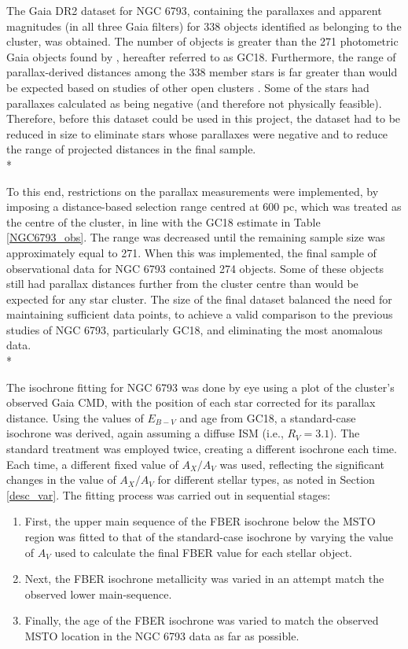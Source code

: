\documentclass[12pt, a4paper]{report}
\begin{document}
The Gaia DR2 dataset for NGC 6793, containing the parallaxes and apparent magnitudes (in all three Gaia filters) for 338 objects identified as belonging to the cluster, was obtained. The number of objects is greater than the 271 photometric Gaia objects found by \cite{2018A&A...616A..10G}, hereafter referred to as GC18. Furthermore, the range of parallax-derived distances among the 338 member stars is far greater than would be expected based on studies of other open clusters \citep{2006A&A...456..523S}. Some of the stars had parallaxes calculated as being negative (and therefore not physically feasible). Therefore, before this dataset could be used in this project, the dataset had to be reduced in size to eliminate stars whose parallaxes were negative and to reduce the range of projected distances in the final sample. \\*

To this end, restrictions on the parallax measurements were implemented, by imposing a distance-based selection range centred at 600 pc, which was treated as the centre of the cluster, in line with the GC18 estimate in Table \ref{NGC6793_obs}. The range was decreased until the remaining sample size was approximately equal to 271. When this was implemented, the final sample of observational data for NGC 6793 contained 274 objects. Some of these objects still had parallax distances further from the cluster centre than would be expected for any star cluster. The size of the final dataset balanced the need for maintaining sufficient data points, to achieve a valid comparison to the previous studies of NGC 6793, particularly GC18, and eliminating the most anomalous data.\\*

The isochrone fitting for NGC 6793 was done by eye using a plot of the cluster's observed Gaia CMD, with the position of each star corrected for its parallax distance. Using the values of $E_{B-V}$ and age from GC18, a standard-case isochrone was derived, again assuming a diffuse ISM (i.e., $R_{V} = 3.1$). The standard treatment was employed twice, creating a different isochrone each time. Each time, a different fixed value of $A_{X}/A_{V}$ was used, reflecting the significant changes in the value of $A_{X}/A_{V}$ for different stellar types, as noted in Section \ref{desc_var}. The fitting process was carried out in sequential stages:

\begin{enumerate}
\item First, the upper main sequence of the FBER isochrone below the MSTO region was fitted to that of the standard-case isochrone by varying the value of $A_{V}$ used to calculate the final FBER value for each stellar object.
\item Next, the FBER isochrone metallicity was varied in an attempt match the observed lower main-sequence.
\item Finally, the age of the FBER isochrone was varied to match the observed MSTO location in the NGC 6793 data as far as possible.

\end{enumerate}
\end{document}
